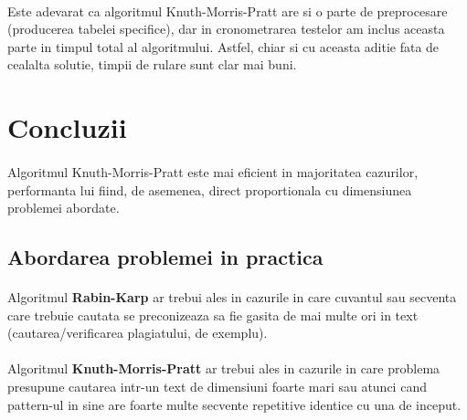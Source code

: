 \documentclass[runningheads]{llncs}
\begin{document}
\paragraph{} Este adevarat ca algoritmul Knuth-Morris-Pratt are si o parte de preprocesare (producerea tabelei specifice), dar in cronometrarea testelor am inclus aceasta parte in timpul total al algoritmului. Astfel, chiar si cu aceasta aditie fata de cealalta solutie, timpii de rulare sunt clar mai buni.

\section{Concluzii}
\paragraph{} Algoritmul Knuth-Morris-Pratt este mai eficient in majoritatea cazurilor, performanta lui fiind, de asemenea, direct proportionala cu dimensiunea problemei abordate.

\subsection{Abordarea problemei in practica}
\paragraph{} Algoritmul \textbf{Rabin-Karp} ar trebui ales in cazurile in care cuvantul sau secventa care trebuie cautata se preconizeaza sa fie gasita de mai multe ori in text (cautarea/verificarea plagiatului, de exemplu).
\paragraph{} Algoritmul \textbf{Knuth-Morris-Pratt} ar trebui ales in cazurile in care problema presupune cautarea intr-un text de dimensiuni foarte mari sau atunci cand pattern-ul in sine are foarte multe secvente repetitive identice cu una de inceput.
\end{document}
